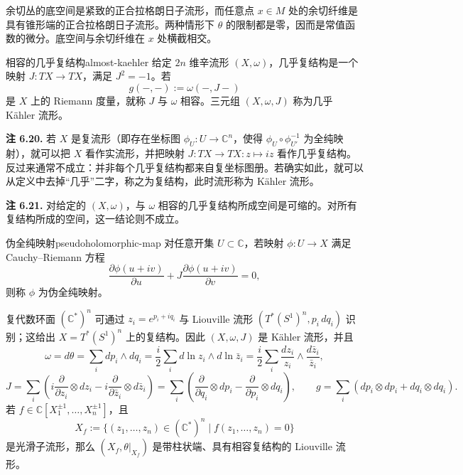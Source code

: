 \begin{example}[余切丛中的零截面与纤维]
余切丛的底空间是紧致的正合拉格朗日子流形，而任意点 $x\in M$ 处的余切纤维是具有锥形端的正合拉格朗日子流形。两种情形下 $\theta$ 的限制都是零，因而是常值函数的微分。底空间与余切纤维在 $x$ 处横截相交。
\end{example}

\begin{definition}{相容的几乎复结构}{almost-kaehler}
给定 $2n$ 维辛流形 $(X,\omega)$，几乎复结构是一个映射 $J\colon TX\to TX$，满足 $J^2=-1$。若
\[
  g(-,-):=\omega(-,J-)
\]
是 $X$ 上的 Riemann 度量，就称 $J$ 与 $\omega$ 相容。三元组 $(X,\omega,J)$ 称为几乎 Kähler 流形。
\end{definition}

\begin{note}\label{note:almost-complex-structure}
\textbf{注 6.20.} 若 $X$ 是复流形（即存在坐标图 $\phi_U\colon U\to\mathbb C^n$，使得 $\phi_U\circ\phi_{U'}^{-1}$ 为全纯映射），就可以把 $X$ 看作实流形，并把映射 $J\colon TX\to TX:z\mapsto iz$ 看作几乎复结构。反过来通常不成立：并非每个几乎复结构都来自复坐标图册。若确实如此，就可以从定义中去掉“几乎”二字，称之为复结构，此时流形称为 Kähler 流形。
\end{note}

\begin{note}\label{note:compatible-almost-complex-contractible}
\textbf{注 6.21.} 对给定的 $(X,\omega)$，与 $\omega$ 相容的几乎复结构所成空间是可缩的。对所有复结构所成的空间，这一结论则不成立。
\end{note}

\begin{definition}{伪全纯映射}{pseudoholomorphic-map}
对任意开集 $U\subset\mathbb C$，若映射 $\phi\colon U\to X$ 满足 Cauchy--Riemann 方程
\[
  \frac{\partial\phi(u+iv)}{\partial u}
  +J\frac{\partial\phi(u+iv)}{\partial v}=0,
\]
则称 $\phi$ 为伪全纯映射。
\end{definition}

\begin{example}
\par
复代数环面 $(\mathbb C^*)^n$ 可通过 $z_i=e^{p_i+iq_i}$ 与 Liouville 流形 $(T^*(S^1)^n,p_i\,dq_i)$ 识别；这给出 $X=T^*(S^1)^n$ 上的复结构。因此 $(X,\omega,J)$ 是 Kähler 流形，并且
\[
  \omega=d\theta=\sum_i dp_i\wedge dq_i
  =\frac{i}{2}\sum_i d\ln z_i\wedge d\ln\bar z_i
  =\frac{i}{2}\sum_i\frac{dz_i}{z_i}\wedge\frac{d\bar z_i}{\bar z_i},
\]
\[
  J=\sum_i\left(i\frac{\partial}{\partial z_i}\otimes dz_i
   -i\frac{\partial}{\partial\bar z_i}\otimes d\bar z_i\right)
  =\sum_i\left(\frac{\partial}{\partial q_i}\otimes dp_i
   -\frac{\partial}{\partial p_i}\otimes dq_i\right),
  \qquad
  g=\sum_i(dp_i\otimes dp_i+dq_i\otimes dq_i).
\]
若 $f\in\mathbb C[X_1^{\pm1},\ldots,X_n^{\pm1}]$，且
\[
  X_f:=\{(z_1,\ldots,z_n)\in(\mathbb C^*)^n\mid f(z_1,\ldots,z_n)=0\}
\]
是光滑子流形，那么 $(X_f,\theta|_{X_f})$ 是带柱状端、具有相容复结构的 Liouville 流形。
\end{example}

